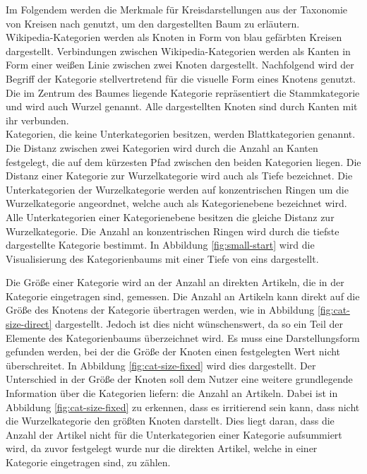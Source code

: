 
Im Folgendem werden die Merkmale für Kreisdarstellungen aus der Taxonomie von Kreisen nach \cite[p.~57]{lima2017circle} genutzt, um den dargestellten Baum zu erläutern.\\
Wikipedia-Kategorien werden als Knoten in Form von blau gefärbten Kreisen dargestellt.
Verbindungen zwischen Wikipedia-Kategorien werden als Kanten in Form einer weißen Linie zwischen zwei Knoten dargestellt.
Nachfolgend wird der Begriff der Kategorie stellvertretend für die visuelle Form eines Knotens genutzt.
Die im Zentrum des Baumes liegende Kategorie repräsentiert die Stammkategorie und wird auch Wurzel genannt.
Alle dargestellten Knoten sind durch Kanten mit ihr verbunden.\\
Kategorien, die keine Unterkategorien besitzen, werden Blattkategorien genannt.
Die Distanz zwischen zwei Kategorien wird durch die Anzahl an Kanten festgelegt, die auf dem kürzesten Pfad zwischen den beiden Kategorien liegen.
Die Distanz einer Kategorie zur Wurzelkategorie wird auch als Tiefe bezeichnet.
Die Unterkategorien der Wurzelkategorie werden auf konzentrischen Ringen um die Wurzelkategorie angeordnet, welche auch als Kategorienebene bezeichnet wird.
Alle Unterkategorien einer Kategorienebene besitzen die gleiche Distanz zur Wurzelkategorie.
Die Anzahl an konzentrischen Ringen wird durch die tiefste dargestellte Kategorie bestimmt.
In Abbildung \ref{fig:small-start} wird die Visualisierung des Kategorienbaums mit einer Tiefe von eins dargestellt.

Die Größe einer Kategorie wird an der Anzahl an direkten Artikeln, die in der Kategorie eingetragen sind, gemessen.
Die Anzahl an Artikeln kann direkt auf die Größe des Knotens der Kategorie übertragen werden, wie in Abbildung \ref{fig:cat-size-direct} dargestellt.
Jedoch ist dies nicht wünschenswert, da so ein Teil der Elemente des Kategorienbaums überzeichnet wird.
Es muss eine Darstellungsform gefunden werden, bei der die Größe der Knoten einen festgelegten Wert nicht überschreitet. 
In Abbildung \ref{fig:cat-size-fixed} wird dies dargestellt.
Der Unterschied in der Größe der Knoten soll dem Nutzer eine weitere grundlegende Information über die Kategorien liefern: die Anzahl an Artikeln.
Dabei ist in Abbildung \ref{fig:cat-size-fixed} zu erkennen, dass es irritierend sein kann, dass nicht die Wurzelkategorie den größten Knoten darstellt.
Dies liegt daran, dass die Anzahl der Artikel nicht für die Unterkategorien einer Kategorie aufsummiert wird, da zuvor festgelegt wurde nur die direkten Artikel, welche in einer Kategorie eingetragen sind, zu zählen.

